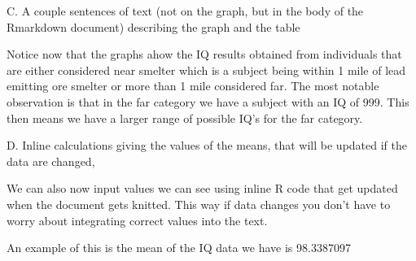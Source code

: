 \documentclass[]{article}
\begin{document}
C. A couple sentences of text (not on the graph, but in the body of the
Rmarkdown document) describing the graph and the table

Notice now that the graphs ahow the IQ results obtained from individuals
that are either considered near smelter which is a subject being within
1 mile of lead emitting ore smelter or more than 1 mile considered far.
The most notable observation is that in the far category we have a
subject with an IQ of 999. This then means we have a larger range of
possible IQ's for the far category.

D. Inline calculations giving the values of the means, that will be
updated if the data are changed,

We can also now input values we can see using inline R code that get
updated when the document gets knitted. This way if data changes you
don't have to worry about integrating correct values into the text.

An example of this is the mean of the IQ data we have is 98.3387097
\end{document}
